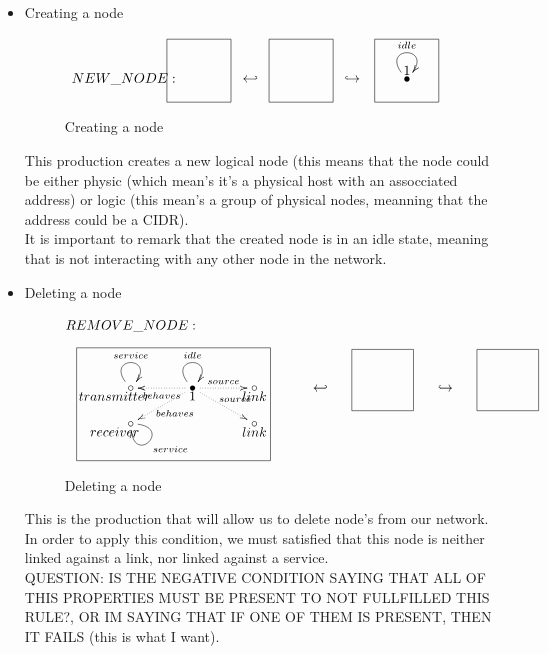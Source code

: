 \documentclass[envcountsect,runningheads]{llncs}
\begin{document}
\begin{itemize}
  \item Creating a node
  \begin{figure}[H]
    \[
       \xymatrix@C=25pt@R=16pt
       {
         {}
         \POS[]-<4.5pc,0pc>\drop{NEW\_NODE:}
         \POS[]+<0pc,.5pc> *+=<3.8pc,3.8pc>[F-]{} & {\hookleftarrow} &
         {}
         \POS[]+<0pc,.5pc> *+=<3.8pc,3.8pc>[F-]{} & {\hookrightarrow} &
         {\bullet} \ar@(ul,ur)^{idle}
         \POS[]+<0pc,.5pc> *+=<3.8pc,3.8pc>[F-]{1} &
       }
    \]
    \caption{Creating a node}
    \protect\label{fig:nodecreation}
  \end{figure}
  This production creates a new logical node (this means that 
  the node could be either physic (which mean's it's a physical host with an 
  assocciated address) or logic (this mean's a group of physical nodes, meanning
  that the address could be a CIDR). \\
  It is important to remark that the created node is in an idle state, meaning 
  that is not interacting with any other node in the network. \\ 

  \item Deleting a node
  \begin{figure}[H]
    \[
       \xymatrix@C=35pt@R=16pt
       {
         {}\POS[]-<0pc,0pc>\drop{REMOVE\_NODE:}
         \\
         \\
         \circ \ar@(ul,ur)^{service} \POS[]-<1pc,.5pc>\drop{transmitter}&
         {\bullet} \ar@(ul,ur)^{idle} \ar@{.>}^{behaves}[l] \ar@{.>}^{behaves}[dl]
         \ar@{.>}^{source}[r] \ar@{.>}^{source}[dr] 
         \POS[]-<0pc,.5pc>\drop{1} &
         \circ \POS[]-<0pc,.5pc>\drop{link}
         \POS[]+<-5pc,-1pc> *+=<12pc,7pc>[F-]{} & {\hookleftarrow} &
         {}
         \POS[]+<0pc,.5pc> *+=<3.8pc,3.8pc>[F-]{} & {\hookrightarrow} &
         {}
         \POS[]+<0pc,.5pc> *+=<3.8pc,3.8pc>[F-]{} &
         \\
         \circ \ar@(r,d)^{service} \POS[]-<1pc,.5pc>\drop{receiver} & &
         \circ \POS[]-<0pc,.5pc>\drop{link}
       }
    \]
    \caption{Deleting a node}
    \protect\label{fig:nodedeletion}
  \end{figure}
  This is the production that will allow us to delete node's from our network. \\ 
  In order to apply this condition, we must satisfied that this node is neither 
  linked against a link, nor linked against a service.\\
  QUESTION: IS THE NEGATIVE CONDITION SAYING THAT ALL OF THIS PROPERTIES 
  MUST BE PRESENT TO NOT FULLFILLED THIS RULE?, OR IM SAYING THAT IF ONE OF
  THEM IS PRESENT, THEN IT FAILS (this is what I want).\\
   

\end{itemize}
\end{document}
